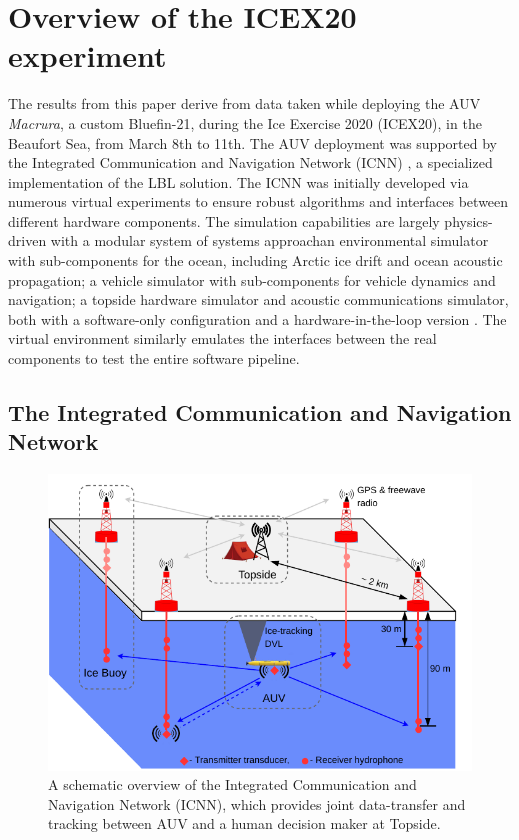 \clearpage
\section{Overview of the ICEX20 experiment}\label{sec:icex20}

The results from this paper derive from data taken while deploying the AUV \emph{Macrura}, a custom Bluefin-21, during the Ice Exercise 2020 (ICEX20), in the Beaufort Sea, from March 8th to 11th.
The AUV deployment was supported by the Integrated Communication and Navigation Network (ICNN) \citep{Schneider2020,Randeni2020,randeni_high-resolution_2021}, a specialized implementation of the LBL solution.
The ICNN was initially developed via numerous virtual experiments to ensure robust algorithms and interfaces between different hardware components. 
The simulation capabilities are largely physics-driven with a modular system of systems approach\textemdash an environmental simulator with sub-components for the ocean, including Arctic ice drift and ocean acoustic propagation; a vehicle simulator with sub-components for vehicle dynamics and navigation; a topside hardware simulator and acoustic communications simulator, both with a software-only configuration and a hardware-in-the-loop version \citep{Schneider2018}.
The virtual environment similarly emulates the interfaces between the real components to test the entire software pipeline.

\subsection{The Integrated Communication and Navigation Network}

\begin{figure}[h!]
	\centering
	\includegraphics[width=\reprintcolumnwidth]{figs/Fig2.pdf}
	\caption{A schematic overview of the Integrated Communication and Navigation Network (ICNN), which provides joint data-transfer and tracking between AUV and a human decision maker at Topside.}
	\label{fig:icnnOverview}
\end{figure}

